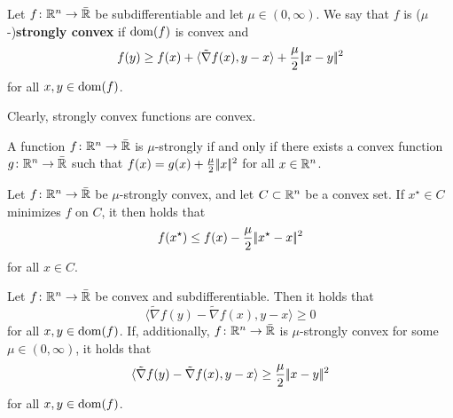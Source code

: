 \begin{definition}
    Let $f\colon \mathbb{R}^n \to \bar{\mathbb{R}}$ be subdifferentiable and let $\mu\in (0,\infty)$.
    We say that $f$ is ($\mu$-)\textbf{strongly convex} if $\operatorname{dom}(f)$ is convex and
    \begin{align*}
        f(y) \geq f(x) + \langle \tilde{\nabla} f(x), y - x \rangle + \frac{\mu}{2} |\!|x - y|\!|^2
    \end{align*}
    for all $x,y\in\operatorname{dom}(f)$.
\end{definition}
Clearly, strongly convex functions are convex.
\begin{proposition}
    \label{prop:strongly-convex-iff-convex-plus-quadratic}
    A function $f\colon\mathbb{R}^n\to\bar{\mathbb{R}}$ is $\mu$-strongly if and only if
    there exists a convex function $g\colon\mathbb{R}^n\to\bar{\mathbb{R}}$ such that
    $f(x) = g(x) + \frac{\mu}{2} |\!|x|\!|^2$ for all $x\in\mathbb{R}^n$.
\end{proposition}
\begin{proposition}
    \label{prop:strongly-convex-bound-on-optimal-value}
    Let $f\colon\mathbb{R}^n\to\bar{\mathbb{R}}$ be $\mu$-strongly convex, and let $C\subset\mathbb{R}^n$ be a convex set.
    If $x^\star\in C$ minimizes $f$ on $C$, it then holds that
    \[
        f(x^\star) \leq f(x) - \frac{\mu}{2} |\!|x^\star - x|\!|^2
    \]
    for all $x\in C$.
\end{proposition}
\begin{proposition}
    \label{prop:convex-implies-monotone-gradient}
    Let $f\colon \mathbb{R}^n\to\bar{\mathbb{R}}$ be convex and subdifferentiable. Then it holds that
    \[
        \langle \tilde{\nabla} f(y) - \tilde{\nabla} f(x), y-x \rangle \geq 0
    \]
    for all $x,y\in\operatorname{dom}(f)$. If, additionally, $f\colon \mathbb{R}^n\to\bar{\mathbb{R}}$ is $\mu$-strongly convex for
    some $\mu\in(0,\infty)$, it holds that
    \[
        \langle \tilde{\nabla} f(y) - \tilde{\nabla} f(x), y-x \rangle \geq \frac{\mu}{2} |\!|x - y|\!|^2
    \]
    for all $x,y\in\operatorname{dom}(f)$.
\end{proposition}

